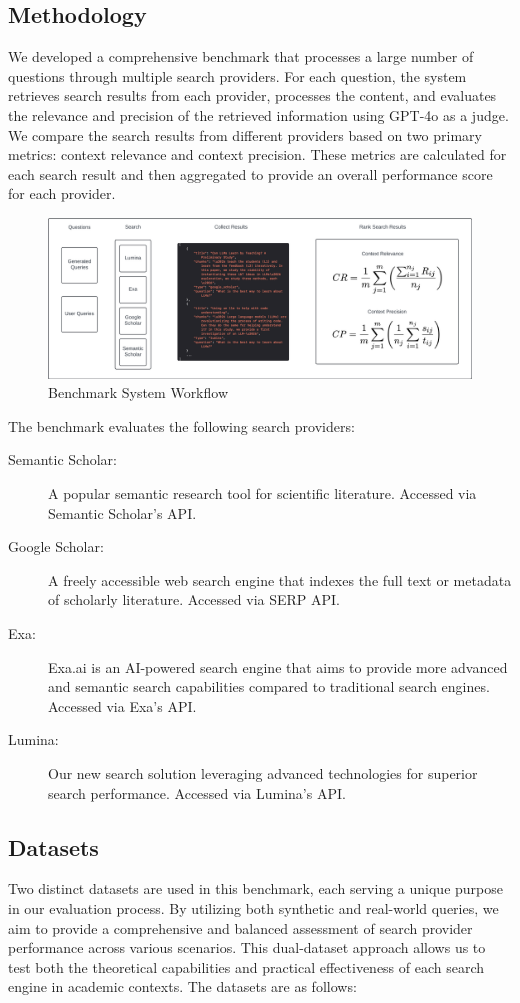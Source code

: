 \documentclass{article}
\begin{document}
\begin{multicols}{2}
\section{Methodology}
We developed a comprehensive benchmark that processes a large number of questions through multiple search providers. For each question, the system retrieves search results from each provider, processes the content, and evaluates the relevance and precision of the retrieved information using GPT-4o as a judge. We compare the search results from different providers based on two primary metrics: context relevance and context precision. These metrics are calculated for each search result and then aggregated to provide an overall performance score for each provider.
\begin{figure}[h]
    \centering
    \includegraphics[width=\columnwidth]{Benchmark_Overview_main.png}
    \caption{Benchmark System Workflow}
\end{figure}
The benchmark evaluates the following search providers:
\begin{description}
    \item[Semantic Scholar:] A popular semantic research tool for scientific literature. Accessed via Semantic Scholar's API.
    \item[Google Scholar:] A freely accessible web search engine that indexes the full text or metadata of scholarly literature. Accessed via SERP API.
    \item[Exa:] Exa.ai is an AI-powered search engine that aims to provide more advanced and semantic search capabilities compared to traditional search engines. Accessed via Exa's API.
    \item[Lumina:] Our new search solution leveraging advanced technologies for superior search performance. Accessed via Lumina's API.
\end{description}
\subsection{Datasets}
Two distinct datasets are used in this benchmark, each serving a unique purpose in our evaluation process. By utilizing both synthetic and real-world queries, we aim to provide a comprehensive and balanced assessment of search provider performance across various scenarios. This dual-dataset approach allows us to test both the theoretical capabilities and practical effectiveness of each search engine in academic contexts. The datasets are as follows:


\end{multicols}
\end{document}
